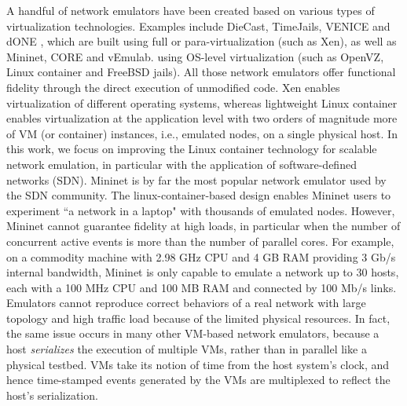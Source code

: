A handful of network emulators have been created based on various types of virtualization technologies. Examples include DieCast\cite{DieCast}, TimeJails\cite{TimeJails}, VENICE\cite{VirtualTimeMachine} and dONE \cite{RelativisticTime}, which are built using full or para-virtualization (such as Xen\cite{Xen}), as well as Mininet\cite{LaptopSDN, ReproNetExprCBE}, CORE\cite{CORE} and vEmulab\cite{Emulab}. using OS-level virtualization (such as OpenVZ\cite{OpenVZ}, Linux container\cite{LXC} and FreeBSD jails\cite{FreeBSDJails}). All those network emulators offer functional fidelity through the direct execution of unmodified code. Xen enables virtualization of different operating systems, whereas lightweight Linux container enables virtualization at the application level with two orders of magnitude more of VM (or container) instances, i.e., emulated nodes, on a single physical host. In this work, we focus on improving the Linux container technology for scalable network emulation, in particular with the application of software-defined networks (SDN). Mininet\cite{LaptopSDN} is by far the most popular network emulator used by the SDN community\cite{Frenetic, AbsNetUpd, LivMigEntNet}. The linux-container-based design enables Mininet users to experiment ``a network in a laptop" with thousands of emulated nodes. However, Mininet cannot guarantee fidelity at high loads, in particular when the number of concurrent active events is more than the number of parallel cores. For example, on a commodity machine with 2.98 GHz CPU and 4 GB RAM providing 3 Gb/s internal bandwidth, Mininet is only capable to emulate a network up to 30 hosts, each with a 100 MHz CPU and 100 MB RAM and connected by 100 Mb/s links\cite{ReproNetExprCBE}. Emulators cannot reproduce correct behaviors of a real network with large topology and high traffic load because of the limited physical resources. In fact, the same issue occurs in many other VM-based network emulators, because a host \emph{serializes} the execution of multiple VMs, rather than in parallel like a physical testbed. VMs take its notion of time from the host system's clock, and hence time-stamped events generated by the VMs are multiplexed to reflect the host's serialization.

